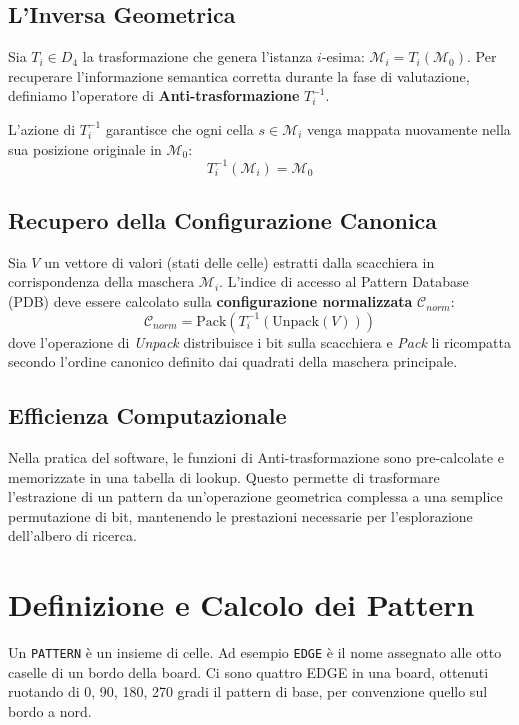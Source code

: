 \subsection{L'Inversa Geometrica}
Sia $T_i \in D_4$ la trasformazione che genera l'istanza $i$-esima: $\mathcal{M}_i = T_i(\mathcal{M}_0)$. Per recuperare l'informazione semantica corretta durante la fase di valutazione, definiamo l'operatore di \textbf{Anti-trasformazione} $T_i^{-1}$.

L'azione di $T_i^{-1}$ garantisce che ogni cella $s \in \mathcal{M}_i$ venga mappata nuovamente nella sua posizione originale in $\mathcal{M}_0$:
\begin{equation}
    T_i^{-1}(\mathcal{M}_i) = \mathcal{M}_0
\end{equation}

\subsection{Recupero della Configurazione Canonica}
Sia $V$ un vettore di valori (stati delle celle) estratti dalla scacchiera in corrispondenza della maschera $\mathcal{M}_i$. L'indice di accesso al Pattern Database (PDB) deve essere calcolato sulla \textbf{configurazione normalizzata} $\mathcal{C}_{norm}$:
\begin{equation}
    \mathcal{C}_{norm} = \text{Pack}(T_i^{-1}(\text{Unpack}(V)))
\end{equation}
dove l'operazione di \textit{Unpack} distribuisce i bit sulla scacchiera e \textit{Pack} li ricompatta secondo l'ordine canonico definito dai quadrati della maschera principale.

\subsection{Efficienza Computazionale}
Nella pratica del software, le funzioni di Anti-trasformazione sono pre-calcolate e memorizzate in una tabella di lookup. Questo permette di trasformare l'estrazione di un pattern da un'operazione geometrica complessa a una semplice permutazione di bit, mantenendo le prestazioni necessarie per l'esplorazione dell'albero di ricerca.

\section{Definizione e Calcolo dei Pattern}

Un \texttt{PATTERN} è un insieme di celle.
Ad esempio \texttt{EDGE} è il nome assegnato alle otto caselle di un bordo della board. Ci sono quattro EDGE in una board,
ottenuti ruotando di 0, 90, 180, 270 gradi il pattern di base, per convenzione quello sul bordo a nord.

